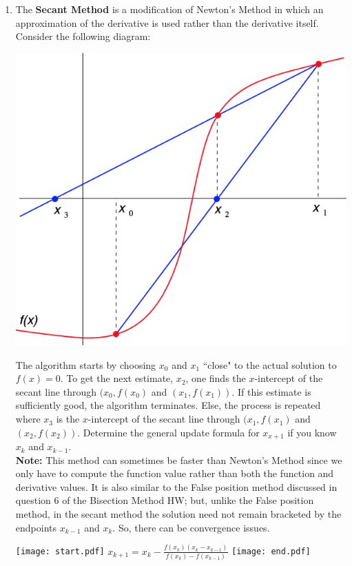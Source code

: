 \documentclass[12pt]{article}
\begin{document}
\begin{enumerate}
\begin{enumerate}
\end{enumerate}

\item The {\bf Secant Method} is a modification of Newton's Method in which an approximation of the derivative is used rather than the derivative itself. Consider the following diagram:

\begin{center}
\includegraphics[scale=0.5]{secant.png}
\end{center}

The algorithm starts by choosing $x_0$ and $x_1$ ``close" to the actual solution to $f(x)=0$.  To get the next estimate, $x_2$, one finds the $x$-intercept of the secant line through $(x_0,f(x_0)$ and $(x_1,f(x_1))$.  If this estimate is sufficiently good, the algorithm terminates.  Else, the process is repeated where $x_3$ is the $x$-intercept of the secant line through $(x_1,f(x_1)$ and $(x_2,f(x_2))$.  Determine the general update formula for $x_{x+1}$ if you know $x_k$ and $x_{k-1}$.\\

{\bf Note:} This method can sometimes be faster than Newton's Method since we only have to compute the function value rather than both the function and derivative values. It is also similar to the False position method discussed in question 6 of the Bisection Method HW; but, unlike the False position method, in the secant method the solution need not remain bracketed by the endpoints $x_{k-1}$ and $x_k$.  So, there can be convergence issues.

\texttt{[image: start.pdf]}
{{$x_{k+1} = x_k - \frac{f(x_k)(x_k-x_{k-1})}{f(x_k)-f(x_{k-1})}$}}
\texttt{[image: end.pdf]}



\end{enumerate}
\end{document}
